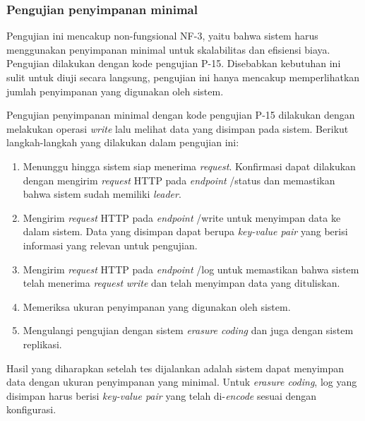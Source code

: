 \subsubsection{Pengujian penyimpanan minimal}
\label{subsubsection:pengujian-penyimpanan-minimal}

Pengujian ini mencakup non-fungsional NF-3, yaitu bahwa sistem harus menggunakan penyimpanan minimal untuk skalabilitas dan efisiensi biaya. Pengujian dilakukan dengan kode pengujian P-15. Disebabkan kebutuhan ini sulit untuk diuji secara langsung, pengujian ini hanya mencakup memperlihatkan jumlah penyimpanan yang digunakan oleh sistem.

Pengujian penyimpanan minimal dengan kode pengujian P-15 dilakukan dengan melakukan operasi \textit{write} lalu melihat data yang disimpan pada sistem. Berikut langkah-langkah yang dilakukan dalam pengujian ini:

\begin{enumerate}
  \item Menunggu hingga sistem siap menerima \textit{request}. Konfirmasi dapat dilakukan dengan mengirim \textit{request} HTTP pada \textit{endpoint} /status dan memastikan bahwa sistem sudah memiliki \textit{leader}.
  \item Mengirim \textit{request} HTTP pada \textit{endpoint} /write untuk menyimpan data ke dalam sistem. Data yang disimpan dapat berupa \textit{key-value pair} yang berisi informasi yang relevan untuk pengujian.
  \item Mengirim \textit{request} HTTP pada \textit{endpoint} /log untuk memastikan bahwa sistem telah menerima \textit{request} \textit{write} dan telah menyimpan data yang dituliskan.
  \item Memeriksa ukuran penyimpanan yang digunakan oleh sistem.
  \item Mengulangi pengujian dengan sistem \textit{erasure coding} dan juga dengan sistem replikasi.
\end{enumerate}

Hasil yang diharapkan setelah tes dijalankan adalah sistem dapat menyimpan data dengan ukuran penyimpanan yang minimal. Untuk \textit{erasure coding}, log yang disimpan harus berisi \textit{key-value pair} yang telah di-\textit{encode} sesuai dengan konfigurasi.